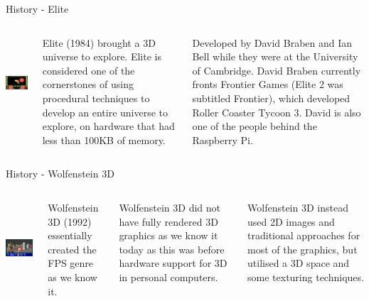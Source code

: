 \documentclass[handout,18pt]{beamer}
\begin{document}
\begin{frame}{History - Elite}
\begin{columns}
\includegraphics[height=3.5cm]{elite.jpg}

\vspace{15pt}
Elite (1984) brought a 3D universe to explore. Elite is considered one of the cornerstones of using procedural techniques to develop an entire universe to explore, on hardware that had less than 100KB of memory.

Developed by David Braben and Ian Bell while they were at the University of Cambridge.  David Braben currently fronts Frontier Games (Elite 2 was subtitled Frontier), which developed Roller Coaster Tycoon 3.  David is also one of the people behind the Raspberry Pi.
\end{columns}
\end{frame}

\begin{frame}{History - Wolfenstein 3D}
\begin{columns}
\includegraphics[height=3.5cm]{Wolfenstein3d.png}

\vspace{15pt}
Wolfenstein 3D (1992) essentially created the FPS genre as we know it.

\vspace{11pt}
Wolfenstein 3D did not have fully rendered 3D graphics as we know it today as this was before hardware support for 3D in personal computers.

\vspace{11pt}
Wolfenstein 3D instead used 2D images and traditional approaches for most of the graphics, but utilised a 3D space and some texturing techniques.
\end{columns}
\end{frame}
\end{document}
